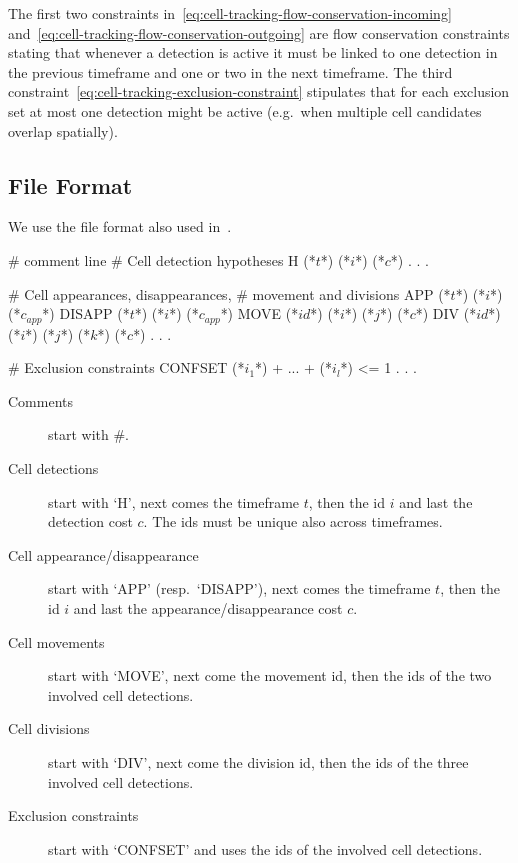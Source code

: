 The first two constraints in~\eqref{eq:cell-tracking-flow-conservation-incoming} and~\eqref{eq:cell-tracking-flow-conservation-outgoing} are flow conservation constraints stating that whenever a detection is active it must be linked to one detection in the previous timeframe and one or two in the next timeframe.
The third constraint~\eqref{eq:cell-tracking-exclusion-constraint} stipulates that for each exclusion set at most one detection might be active (e.g.\ when multiple cell candidates overlap spatially).

\subsection{File Format}
We use the file format also used in~\cite{haller2020primal}.

\begin{fileformat}
# comment line
# Cell detection hypotheses
H (*$t$*) (*$i$*) (*$c$*)
.
.
.

# Cell appearances, disappearances,
# movement and divisions
APP (*$t$*) (*$i$*) (*$c_{app}$*)
DISAPP (*$t$*) (*$i$*) (*$c_{app}$*)
MOVE (*$id$*) (*$i$*) (*$j$*) (*$c$*)
DIV (*$id$*) (*$i$*) (*$j$*) (*$k$*) (*$c$*)
.
.
.

# Exclusion constraints
CONFSET (*$i_1$*) + ... + (*$i_l$*) <= 1
.
.
.
\end{fileformat}

\begin{description}
    \item[\normalfont Comments] start with \#.
    \item[\normalfont Cell detections] start with `H', next comes the timeframe $t$, then the id $i$ and last the detection cost $c$. The ids must be unique also across timeframes.
    \item[\normalfont Cell appearance/disappearance] start with `APP' (resp.\ `DISAPP'), next comes the timeframe $t$, then the id $i$ and last the appearance/disappearance cost $c$.
    \item[\normalfont Cell movements] start with `MOVE', next come the movement id, then the ids of the two involved cell detections.
    \item[\normalfont Cell divisions] start with `DIV', next come the division id, then the ids of the three involved cell detections.
    \item[\normalfont Exclusion constraints] start with `CONFSET' and uses the ids of the involved cell detections.
\end{description}

